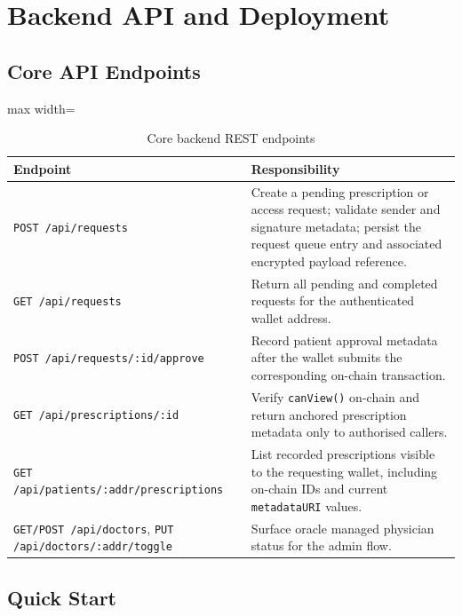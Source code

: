 \documentclass[12pt,a4wide]{report}
\begin{document}
\section{Backend API and Deployment}

\subsection{Core API Endpoints}

\begin{table}[H]
\centering
\caption{Core backend REST endpoints}
\label{tab:api}
\begin{adjustbox}{max width=\textwidth}
\begin{tabular}{@{}p{5.8cm}p{7.2cm}@{}}
\toprule
\textbf{Endpoint} & \textbf{Responsibility} \\
\midrule
\texttt{POST /api/requests} & Create a pending prescription or access request; validate sender and signature metadata; persist the request queue entry and associated encrypted payload reference. \\[4pt]
\texttt{GET /api/requests} & Return all pending and completed requests for the authenticated wallet address. \\[4pt]
\texttt{POST /api/requests/:id/approve} & Record patient approval metadata after the wallet submits the corresponding on-chain transaction. \\[4pt]
\texttt{GET /api/prescriptions/:id} & Verify \texttt{canView()} on-chain and return anchored prescription metadata only to authorised callers. \\[4pt]
\texttt{GET /api/patients/:addr/prescriptions} & List recorded prescriptions visible to the requesting wallet, including on-chain IDs and current \texttt{metadataURI} values. \\[4pt]
\texttt{GET/POST /api/doctors}, \texttt{PUT /api/doctors/:addr/toggle} & Surface oracle managed physician status for the admin flow. \\
\bottomrule
\end{tabular}
\end{adjustbox}
\end{table}

\subsection{Quick Start}
\end{document}
